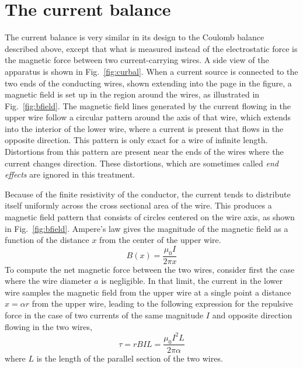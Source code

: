 \documentclass{revtex4}
\begin{document}
\section{The current balance}

The current balance is very similar in its design to the Coulomb balance
described above, except that what is measured instead of the electrostatic
force is the magnetic force between two current-carrying wires.  A side
view of the apparatus is shown in Fig.~\ref{fig:curbal}.
When a current source is connected to the two ends of the conducting wires,
shown extending into the page in the figure, a magnetic field is set up
in the region around the wires, as illustrated in Fig.~\ref{fig:bfield}.
The magnetic field lines generated by the current flowing in the upper
wire follow a circular pattern around the axis of that wire, which extends
into the interior of the lower wire, where a current is present that flows
in the opposite direction.  This pattern is only exact for a wire of
infinite length. Distortions from this pattern are present near the
ends of the wires where the current changes direction.  These distortions,
which are sometimes called {\em end effects} are ignored in this treatment.

Because of the finite resistivity of the conductor, the current tends to
distribute itself uniformly across the cross sectional area of the wire.
This produces a magnetic field pattern that consists of circles centered
on the wire axis, as shown in Fig.~\ref{fig:bfield}.  Ampere's law gives
the magnitude of the magnetic field as a function of the distance $x$
from the center of the upper wire.
\begin{equation}
B(x)=\frac{\mu_0I}{2\pi x}
\end{equation}
To compute the net magnetic force between the two wires, consider first
the case where the wire diameter $a$ is negligible.  In that limit, the
current in the lower wire samples the magnetic field from the upper wire
at a single point a distance $x=\alpha r$ from the upper wire, leading to
the following expression for the repulsive force in the case of two
currents of the same magnitude $I$ and opposite direction flowing in
the two wires,
\begin{equation}
\tau=rBIL=\frac{\mu_0I^2L}{2\pi\alpha}
\label{eq:tauwitha0}
\end{equation}
where $L$ is the length of the parallel section of the two wires.
\end{document}
